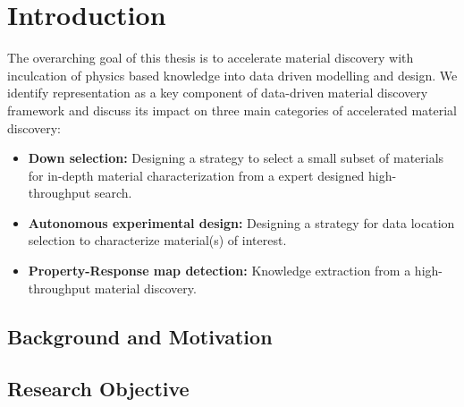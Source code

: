 \chapter{Introduction}\label{chap:intro}
The overarching goal of this thesis is to accelerate material discovery with inculcation of physics based knowledge into data driven modelling and design.
We identify representation as a key component of data-driven material discovery framework and discuss its impact on three main categories of accelerated material discovery:
\begin{itemize}
    \item {\textbf{Down selection:} Designing a strategy to select a small subset of materials for in-depth material characterization from a expert designed high-throughput search.}
    \item {\textbf{Autonomous experimental design:} Designing a strategy for data location selection to characterize material(s) of interest.}
    \item {\textbf{Property-Response map detection:} Knowledge extraction from a high-throughput material discovery. }
\end{itemize}
\section{Background and Motivation}\label{sec1.1}
 
\section{Research Objective}\label{sec1.2}

